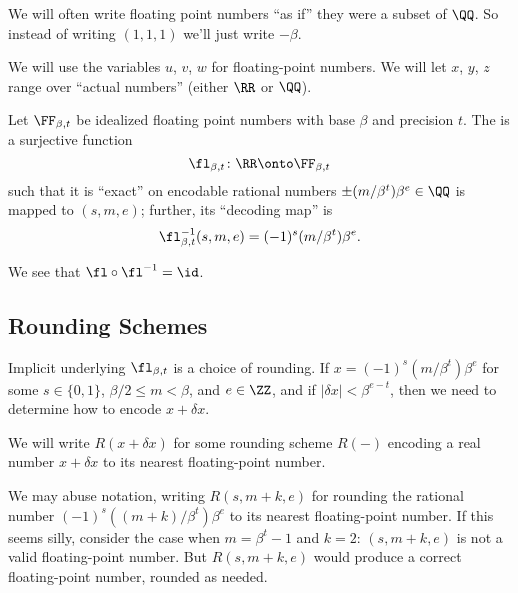\begin{rmk}
We will often write floating point numbers ``as if'' they were a subset
of $\QQ$. So instead of writing $(1,1,1)$ we'll just write $-\beta$.
\end{rmk}

\begin{convention}
  We will use the variables $u$, $v$, $w$ for floating-point numbers. 
  We will let $x$, $y$, $z$ range over ``actual numbers'' (either $\RR$
  or $\QQ$).
\end{convention}

\begin{defn}
Let $\FF_{\beta,t}$ be idealized floating point numbers with base
$\beta$ and precision $t$. The  is a surjective
function
\begin{equation}
  \fl_{\beta,t}\colon\RR\onto\FF_{\beta,t}
\end{equation}
such that it is ``exact'' on encodable rational numbers $\pm(m/\beta^{t})\beta^{e}\in\QQ$
is mapped to $(s,m,e)$; further, its ``decoding map'' is
\begin{equation}
  \fl_{\beta,t}^{-1}(s,m,e) = (-1)^{s}(m/\beta^{t})\beta^{e}.
\end{equation}
\end{defn}

\begin{thm}
  We see that $\fl\circ\fl^{-1}=\id$.
\end{thm}

\subsection{Rounding Schemes}

\begin{rmk}
  Implicit underlying $\fl_{\beta,t}$ is a choice of rounding. If
  $x = (-1)^{s}(m/\beta^{t})\beta^{e}$ for some $s\in\{0,1\}$,
  $\beta/2\leq m<\beta$, and $e\in\ZZ$, and if $|\delta x| < \beta^{e-t}$,
  then we need to determine how to encode $x + \delta x$.

  We will write $R(x+\delta x)$ for some rounding scheme $R(-)$ encoding
  a real number $x+\delta x$ to its nearest floating-point number.
\end{rmk}
\begin{notation}
  We may abuse notation, writing $R(s,m+k,e)$ for rounding the rational
  number $(-1)^{s}((m+k)/\beta^{t})\beta^{e}$ to its nearest
  floating-point number. If this seems silly, consider the case when
  $m=\beta^{t}-1$ and $k=2$: $(s,m+k,e)$ is not a valid floating-point
  number. But $R(s,m+k,e)$ would produce a correct floating-point
  number, rounded as needed.
\end{notation}


